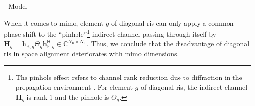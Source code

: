 \documentclass[journal]{IEEEtran}
\begin{document}
\begin{section}{- Model}
\begin{itemize}
		When it comes to \gls{mimo}, element $g$ of diagonal \gls{ris} can only apply a common phase shift to the ``pinhole''\footnote{The pinhole effect refers to channel rank reduction due to diffraction in the propagation environment \cite{Almers2006}. For element $g$ of diagonal \gls{ris}, the indirect channel $\mathbf{H}_g$ is rank-1 and the pinhole is $\Theta_g$.} indirect channel passing through itself by $\mathbf{H}_g = \mathbf{h}_{\mathrm{B},g} \Theta_g \mathbf{h}_{\mathrm{F},g}^\mathsf{H} \in \mathbb{C}^{N_\mathrm{R} \times N_\mathrm{T}}$.
		Thus, we conclude that
		{the disadvantage of diagonal \gls{ris} in space alignment deteriorates with \gls{mimo} dimensions.}
	\end{itemize}









\end{section}
\end{document}

